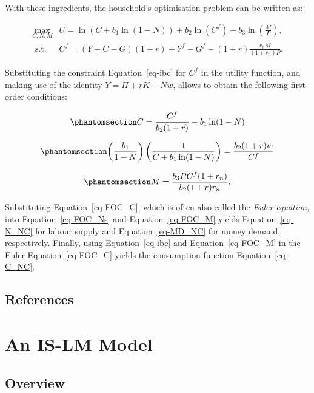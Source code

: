 \documentclass[
  letterpaper,
  DIV=11,
  numbers=noendperiod]{scrreprt}
\begin{document}
With these ingredients, the household's optimisation problem can be
written as:

\[
\begin{array}{ll}
\max _{C, N, M} & U=\ln (C+b_1 \ln (1-N))+b_2 \ln \left(C^f\right)+b_3 \ln \left(\frac{M}{P}\right), \\
\text { s.t. } & C^f= (Y-C-G)(1+r)+Y^f -G^f - (1+r)\frac{r_nM}{(1+r_n)P} .
\end{array}
\]

Substituting the constraint Equation~\ref{eq-ibc} for \(C^f\) in the
utility function, and making use of the identity \(Y=\Pi+rK+Nw\), allows
to obtain the following first-order conditions:

\begin{equation}\phantomsection\label{eq-FOC_C}{
C=\frac{C^f}{b_2(1+r)} - b_1\ln(1-N)
}\end{equation}

\begin{equation}\phantomsection\label{eq-FOC_Ns}{
\left(\frac{b_1}{1-N}\right)\left(\frac{1}{C+b_1\ln(1-N)} \right)=\frac{b_2(1+r)w}{C^f}
}\end{equation}

\begin{equation}\phantomsection\label{eq-FOC_M}{
M=\frac{b_3PC^f(1+r_n)}{b_2(1+r)r_n} .
}\end{equation}

Substituting Equation~\ref{eq-FOC_C}, which is often also called the
\emph{Euler equation}, into Equation~\ref{eq-FOC_Ns} and
Equation~\ref{eq-FOC_M} yields Equation~\ref{eq-N_NC} for labour supply
and Equation~\ref{eq-MD_NC} for money demand, respectively. Finally,
using Equation~\ref{eq-ibc} and Equation~\ref{eq-FOC_M} in the Euler
Equation~\ref{eq-FOC_C} yields the consumption function
Equation~\ref{eq-C_NC}.

\section*{References}\label{references-1}


\chapter{An IS-LM Model}\label{sec-islm-model}

\section{Overview}\label{overview-1}
\end{document}
